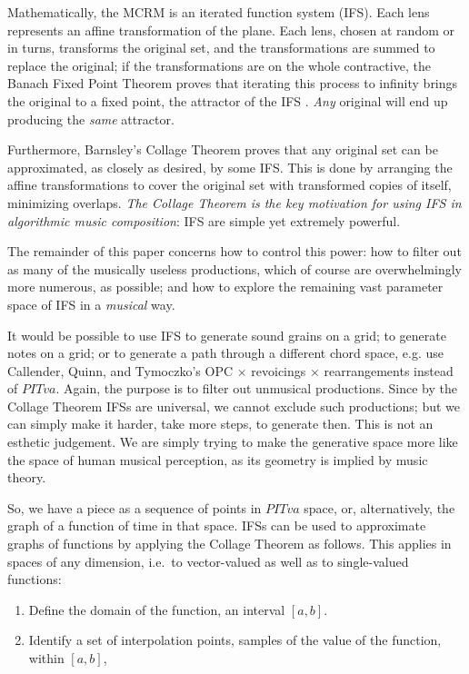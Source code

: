 \documentclass[english,11pt,letterpaper,onecolumn]{scrartcl}
\begin{document}
Mathematically, the MCRM is an iterated function system (IFS). Each lens 
represents an affine transformation of the plane. Each lens, chosen at random 
or in turns, transforms the original set, and the transformations are summed 
to replace the original; if the transformations are on the whole contractive, 
the Banach Fixed Point Theorem proves that iterating this process to infinity 
brings the original to a fixed point, the attractor of the IFS 
\cite{chaosandfractals, barnsley1985iterated, 10.2307/24893080, 
fractalseverywhere}. \textit{Any} original will end up producing the 
\textit{same} attractor. 

Furthermore, Barnsley's Collage Theorem \cite{barnsley:1986:solution} proves 
that any original set can be approximated, as closely as desired, by some IFS. 
This is done by arranging the affine transformations to cover the original set 
with transformed copies of itself, minimizing overlaps. \textit{The Collage 
Theorem is the key motivation for using IFS in algorithmic music composition}: 
IFS are simple yet extremely powerful. 

The remainder of this paper concerns how to control this power: how to 
filter out as many of the musically useless productions, which of course are 
overwhelmingly more numerous, as possible; and how to explore the 
remaining vast parameter space of IFS in a \textit{musical} way.

It would be possible to use IFS to generate sound grains on a grid; to 
generate notes on a grid; or to generate a path through a different chord 
space, e.g. use Callender, Quinn, and Tymoczko's OPC $\times$ revoicings 
$\times$ rearrangements instead of $PITva$. Again, the purpose is to filter 
out unmusical productions. Since by the Collage Theorem IFSs are universal, we 
cannot exclude such productions; but we can simply make it harder, take more 
steps, to generate then. This is not an esthetic judgement. We are 
simply trying to make the generative space more like the space of human 
musical perception, as its geometry is implied by music theory.

So, we have a piece as a sequence of points in $PITva$ space, or, 
alternatively, the graph of a function of time in that space. IFSs can 
be used to approximate graphs of functions by applying the Collage Theorem 
as follows. This applies in spaces of any dimension, i.e.\ to vector-valued as 
well as to single-valued functions:

\begin{enumerate}
 \item Define the domain of the function, an interval $[a, b]$.
 \item Identify a set of interpolation points, samples of the value of the 
function, within $[a, b]$, 
\end{enumerate}
\end{document}
